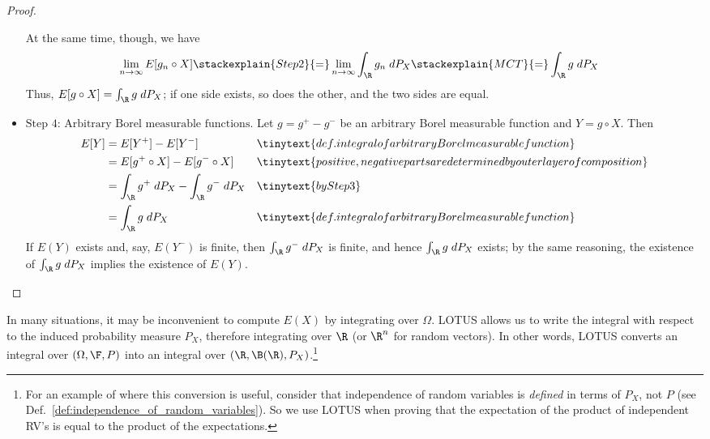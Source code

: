 \documentclass{article} %
\begin{document}
\begin{proof}
\begin{itemize}
At the same time, though, we have
\begin{align*}
\lim_{n \to \infty} E[g_n \circ X] & \stackexplain{Step 2}{=} 	 \lim_{n \to \infty} \int_\R g_n \; dP_X  \stackexplain{MCT}{=}  \int_\R g \; dP_X 
\end{align*}
Thus, $ E[ g \circ X] = \int_\R g \; dP_X $; if one side exists, so does the other, and the two sides are equal. 
\item $\boxed{\text{Step 4: Arbitrary Borel measurable functions.}}$ Let $g = g^+ - g^-$ be an arbitrary Borel measurable function and $Y = g \circ X$.  Then 
\begin{align*}
E[Y] & = E[Y^+] - E[Y^-] && \tinytext{def. integral of arbitrary Borel measurable function}\\
& = E[g^+ \circ X] - E[g^- \circ X] && \tinytext{positive, negative parts are determined by outer layer of composition}\\
& = \int_\R g^+ \; dP_X - \int_\R g^- \; dP_X && \tinytext{by Step 3 }\\
&= \int_\R g \; dP_X && \tinytext{def. integral of arbitrary Borel measurable function}\\
\end{align*}
If $E(Y)$ exists and, say, $E(Y^-)$ is finite, then $\int_\R g^- \; dP_X$ is finite, and hence $\int_\R g \; dP_X$ exists; by the same reasoning, the existence of $\int_\R g \; dP_X$ implies the existence of $E(Y)$.  
\end{itemize}
	
\end{proof}




\begin{remark}{} 
In many situations, it may be inconvenient to compute $E(X)$ by integrating over $\Omega$.  LOTUS allows us to write the integral with respect to the induced probability measure $P_X$, therefore integrating over $\R$ (or $\R^n$ for random vectors).   In other words, LOTUS converts an integral over $(\Omega, \F, P)$ into an integral over $(\R, \B(\R), P_X)$.\footnote{For an example of where this conversion is useful, consider that independence of random variables is \textit{defined} in terms of $P_X$, not $P$ (see Def.~\ref{def:independence_of_random_variables}).  So we use LOTUS when proving that the expectation of the product of independent RV's is equal to the product of the expectations.}
\end{remark}
\end{document}
